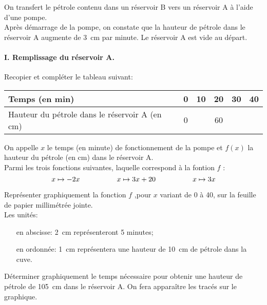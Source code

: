 On transfert le pétrole contenu dans un réservoir B vers un réservoir A à l'aide d'une pompe.\\
Après démarrage de la pompe, on constate que la hauteur de pétrole
dans le réservoir A augmente de 3~cm par minute. Le réservoir A est
vide au départ.
\paragraph{I. Remplissage du réservoir A.}\hfill\newline
\begin{myenumerate}
  \item Recopier et compléter le tableau suivant:
    \begin{center}
      \begin{tabular}{|l|c|c|c|c|c|}
        \hline
        Temps (en min)&0&10&20&30&40\\
        \hline
        Hauteur du pétrole dans le réservoir A (en cm)&0&&60&&\\
        \hline
      \end{tabular}
    \end{center}
  \item On appelle $x$ le temps (en minute) de fonctionnement de la
    pompe et $f(x)$ la hauteur du pétrole (en cm) dans le réservoir
    A.\\Parmi les trois fonctions suivantes, laquelle correspond à la
    fontion $f$ :
    \[x\mapsto-2x\kern0.15\linewidth x\mapsto3x+20\kern0.15\linewidth x\mapsto3x\]
  \item Représenter graphiquement la fonction $f$ ,pour $x$ variant de
    0 à 40, sur la feuille de papier millimétrée jointe.
    \\Les unités:
    \begin{itemize}
    \item[en abscisse:] 2~cm représenteront 5 minutes;
    \item[en ordonnée:] 1~cm représentera une hauteur de 10~cm de
      pétrole dans la cuve.
    \end{itemize}
  \item Déterminer graphiquement le temps nécessaire pour obtenir une
    hauteur de pétrole de 105~cm dans le réservoir A. On fera
    apparaître les tracés sur le graphique.
\end{myenumerate}
